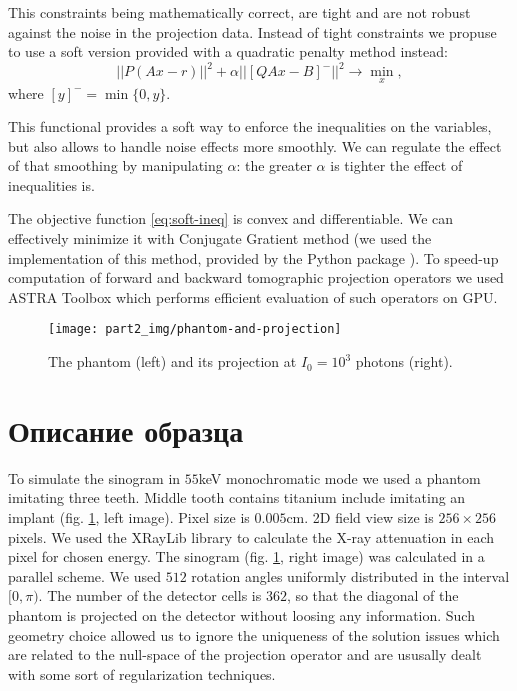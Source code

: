 This constraints being mathematically correct, are tight and are not robust against the noise in the projection data. Instead of tight constraints we propuse to use a soft version provided with a quadratic penalty method \cite{nocedal2006numerical} instead:
\begin{equation}
  \label{eq:soft-ineq}
  ||P(Ax - r)||^2 + \alpha ||[QAx - B]^-||^2 \to \min\limits_x,
\end{equation}
where $[y]^- = \min\{0, y\}$.

This functional provides a soft way to enforce the inequalities on the variables, but also allows to handle noise effects more smoothly. We can regulate the effect of that smoothing by manipulating $\alpha$: the greater $\alpha$ is tighter the effect of inequalities is.

The objective function \eqref{eq:soft-ineq} is convex and differentiable. We can effectively minimize it with Conjugate Gratient method (we used the implementation of this method, provided by the Python package \cite{scipy}). To speed-up computation of forward and backward tomographic projection operators we used ASTRA Toolbox \cite{palenstijn2011performance, van2015astra} which performs efficient evaluation of such operators on GPU.
\begin{figure}[h]
  \centering
  \texttt{[image: part2\_img/phantom-and-projection]}
  \caption{The phantom (left) and its projection at $I_0 = 10^3$ photons (right).}
  \label{phantom-and-projection}
\end{figure}

\section{Описание образца}
\label{s-phantom}
To simulate the sinogram in $55$keV monochromatic mode we used a phantom imitating three teeth. Middle tooth contains titanium include imitating an implant (fig. \ref{phantom-and-projection}, left image). Pixel size is $0.005$cm. 2D field view size is $256 \times 256$ pixels. We used the XRayLib library \cite{brunetti2004library, schoonjans2011xraylib} to calculate the X-ray attenuation in each pixel for chosen energy. The sinogram (fig. \ref{phantom-and-projection}, right image) was calculated in a parallel scheme. We used $512$ rotation angles uniformly distributed in the interval $[0, \pi)$. The number of the detector cells is $362$, so that the diagonal of the phantom is projected on the detector without loosing any information. Such geometry choice allowed us to ignore the uniqueness of the solution issues which are related to the null-space of the projection operator and are ususally dealt with some sort of regularization techniques.

